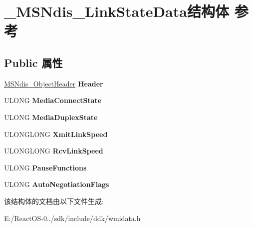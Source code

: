 \hypertarget{struct___m_s_ndis___link_state_data}{}\section{\+\_\+\+M\+S\+Ndis\+\_\+\+Link\+State\+Data结构体 参考}
\label{struct___m_s_ndis___link_state_data}
\subsection*{Public 属性}
\begin{DoxyCompactItemize}
\item 
\mbox{\label{struct___m_s_ndis___link_state_data_ac8aa5febd89b2cc6f624a856e4528e4e}} 
\hyperlink{struct___m_s_ndis___object_header}{M\+S\+Ndis\+\_\+\+Object\+Header} {\bfseries Header}
\item 
\mbox{\label{struct___m_s_ndis___link_state_data_a0bf1aa8f9427c29a15e35e3d70f101fd}} 
U\+L\+O\+NG {\bfseries Media\+Connect\+State}
\item 
\mbox{\label{struct___m_s_ndis___link_state_data_a21ef95a1cbd5536728b8f31c1cdacc89}} 
U\+L\+O\+NG {\bfseries Media\+Duplex\+State}
\item 
\mbox{\label{struct___m_s_ndis___link_state_data_a98f694c781a140257f022e13243c3bd4}} 
U\+L\+O\+N\+G\+L\+O\+NG {\bfseries Xmit\+Link\+Speed}
\item 
\mbox{\label{struct___m_s_ndis___link_state_data_a99dbc05eb3c60f0eeb4815ac5e7bc8b0}} 
U\+L\+O\+N\+G\+L\+O\+NG {\bfseries Rcv\+Link\+Speed}
\item 
\mbox{\label{struct___m_s_ndis___link_state_data_a56b9f28c5478d0a5ca40e2299eed7ec4}} 
U\+L\+O\+NG {\bfseries Pause\+Functions}
\item 
\mbox{\label{struct___m_s_ndis___link_state_data_a1bcce4363e5c715d648115b5ad6144a5}} 
U\+L\+O\+NG {\bfseries Auto\+Negotiation\+Flags}
\end{DoxyCompactItemize}


该结构体的文档由以下文件生成\+:\begin{DoxyCompactItemize}
\item 
E\+:/\+React\+O\+S-\/0../sdk/include/ddk/wmidata.\+h\end{DoxyCompactItemize}
